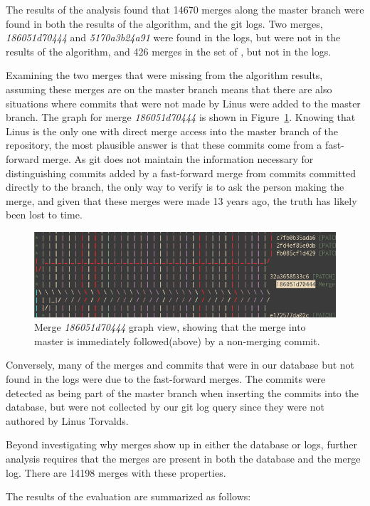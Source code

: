 The results of the analysis found that 14670 merges along the master
branch were found in both the results of the \mt{} algorithm, and the
git logs. Two merges, \emph{186051d70444} and \emph{5170a3b24a91} were
found in the logs, but were not in the results of the algorithm, and 426
merges in the set of , but not in the logs.

Examining the two merges that were missing from the algorithm results,
assuming these merges are on the master branch means that there are also
situations where commits that were not made by Linus were added to the
master branch.
The graph for merge \emph{186051d70444} is shown in
Figure~\ref{fig:missing_merge}.
Knowing that Linus is the only one with direct merge access into the
master branch of the repository, the most plausible answer is that these
commits come from a fast-forward merge.
As git does not maintain the information necessary for distinguishing
commits added by a fast-forward merge from commits committed directly to
the branch, the only way to verify is to ask the person making the
merge, and given that these merges were made 13 years ago, the truth has
likely been lost to time.

\begin{figure}[htpb]
  \centering
  \includegraphics[width=0.8\linewidth]{Figures/model/18605.png}
  \caption{Merge \emph{186051d70444} graph view, showing that the merge
    into master is immediately followed(above) by a non-merging commit.}
  \label{fig:missing_merge}
\end{figure}

Conversely, many of the merges and commits that were in our database but
not found in the logs were due to the fast-forward merges. The commits
were detected as being part of the master branch when inserting the
commits into the database, but were not collected by our git log query
since they were not authored by Linus Torvalds.

Beyond investigating why merges show up in either the database or logs,
further analysis requires that the merges are present in both the
database and the merge log. There are 14198 merges with these
properties.

The results of the evaluation are summarized as follows:

